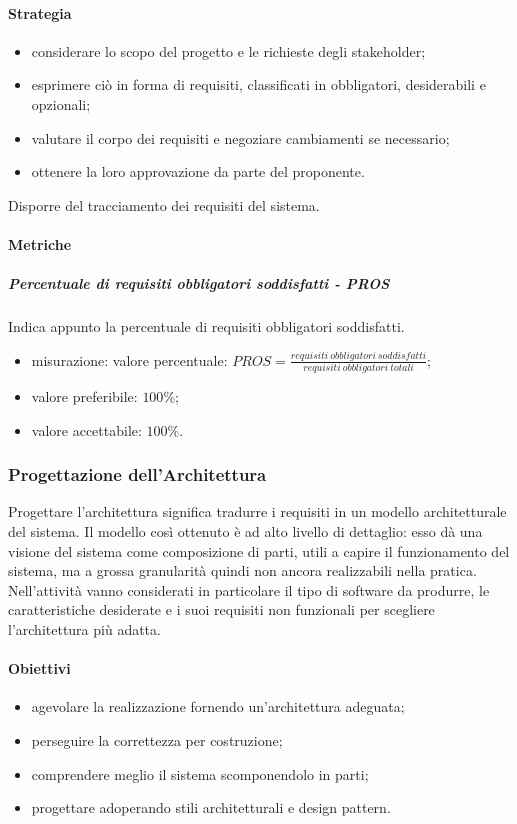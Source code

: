 		\paragraph{Strategia}
		\begin{itemize}
			\item considerare lo scopo del progetto e le richieste degli stakeholder;
			\item esprimere ciò in forma di requisiti, classificati in obbligatori, desiderabili e opzionali;
			\item valutare il corpo dei requisiti e negoziare cambiamenti se necessario;
			\item ottenere la loro approvazione da parte del proponente.
		\end{itemize}
		Disporre del tracciamento dei requisiti del sistema.
		\paragraph{Metriche}
			\subparagraph{Percentuale di requisiti obbligatori soddisfatti - PROS} Indica appunto la percentuale di requisiti obbligatori soddisfatti.
			\begin{itemize}
				\item misurazione: valore percentuale: $ PROS = \frac{requisiti\ obbligatori\ soddisfatti}{requisiti\ obbligatori\ totali}$;
				\item valore preferibile: $100\%$;
				\item valore accettabile: $100\%$.
			\end{itemize}
		
	\subsubsection{Progettazione dell'Architettura}
	Progettare l'architettura significa tradurre i requisiti in un modello architetturale del sistema.
	Il modello così ottenuto è ad alto livello di dettaglio: esso dà una visione del sistema come composizione di parti, utili a capire il funzionamento del sistema, ma a grossa granularità quindi non ancora realizzabili nella pratica.\newline
	Nell'attività vanno considerati in particolare il tipo di software da produrre, le caratteristiche desiderate e i suoi requisiti non funzionali per scegliere l'architettura più adatta.
		\paragraph{Obiettivi}
		\begin{itemize}
			\item agevolare la realizzazione fornendo un'architettura adeguata;
			\item perseguire la correttezza per costruzione;
			\item comprendere meglio il sistema scomponendolo in parti;
			\item progettare adoperando stili architetturali e design pattern.
		\end{itemize}
